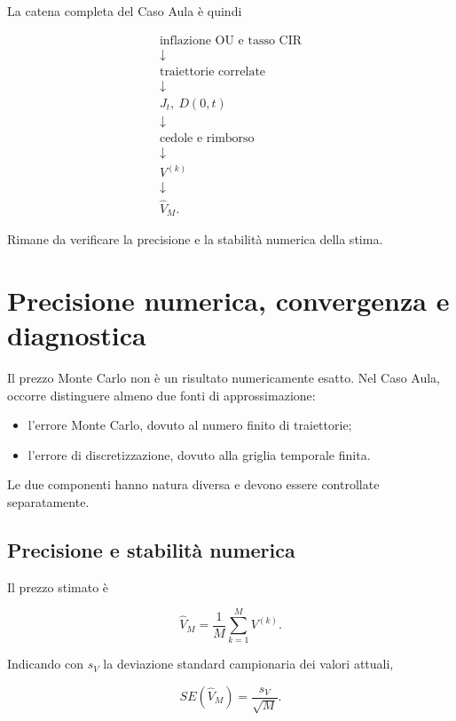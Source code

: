 La catena completa del Caso Aula \`e quindi

\[
\begin{array}{c}
\text{inflazione OU e tasso CIR}
\\[3pt]
\downarrow
\\[3pt]
\text{traiettorie correlate}
\\[3pt]
\downarrow
\\[3pt]
J_t,\ D(0,t)
\\[3pt]
\downarrow
\\[3pt]
\text{cedole e rimborso}
\\[3pt]
\downarrow
\\[3pt]
V^{(k)}
\\[3pt]
\downarrow
\\[3pt]
\widehat V_M.
\end{array}
\]

Rimane da verificare la precisione e la stabilit\`a numerica della stima.


\section{Precisione numerica, convergenza e diagnostica}

Il prezzo Monte Carlo non \`e un risultato numericamente esatto. Nel Caso
Aula, occorre distinguere almeno due fonti di approssimazione:

\begin{itemize}

\item l'errore Monte Carlo, dovuto al numero finito di traiettorie;

\item l'errore di discretizzazione, dovuto alla griglia temporale finita.

\end{itemize}

Le due componenti hanno natura diversa e devono essere controllate
separatamente.

\subsection{Precisione e stabilit\`a numerica}

Il prezzo stimato \`e

\[
\widehat V_M
=
\frac{1}{M}
\sum_{k=1}^{M}
V^{(k)}.
\]

Indicando con \(s_V\) la deviazione standard campionaria dei valori attuali,

\[
SE(\widehat V_M)
=
\frac{s_V}{\sqrt{M}}.
\]

